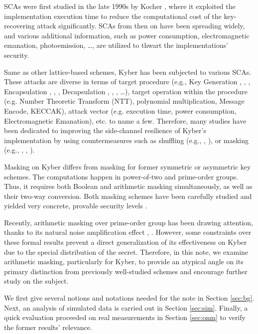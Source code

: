 \documentclass{llncs}
\begin{document}
	SCAs were first studied in the late 1990s by Kocher \cite{kocher}, where it exploited the implementation execution time to reduce the computational cost of the key-recovering attack significantly. SCAs from then on have been spreading widely, and various  additional information, such as power consumption, electromagnetic emanation, photoemission, \dots, are utilized to thwart the implementations' security.
	
	Same as other lattice-based schemes, Kyber has been subjected to various SCAs. These attacks are diverse in terms of target procedure (e.g., Key Generation \cite{primas}, \cite{primas2}, \cite{liu}, Encapsulation \cite{menc1}, \cite{menc2}, \cite{menc3}, Decapsulation \cite{decaps1}, \cite{decaps2}, \cite{decaps3}, \dots), target operation within the procedure (e.g. Number Theoretic Transform (NTT), polynomial multiplication, Message Encode, KECCAK), attack vector (e.g. execution time, power consumption, Electromagnetic Emanation), etc. to name a few. Therefore, many studies have been dedicated to improving the side-channel resilience of Kyber's implementation by using countermeasures such as shuffling (e.g.,  \cite{shuffling}, \cite{menc1}), or masking (e.g.,  \cite{scr}, \cite{Kmask1}, \cite{Kmaskimp0}).
	
	
	
	Masking on Kyber differs from masking for former symmetric or asymmetric key schemes. The computations happen in power-of-two and prime-order groups. Thus, it requires both Boolean and arithmetic masking simultaneously, as well as their two-way conversion. Both masking schemes have been carefully studied and yielded very concrete, provable security levels . 
	
	Recently, arithmetic masking over prime-order group has been drawing attention, thanks to its natural noise amplification effect \cite{optimalmask}, \cite{primemask}. However, some constraints over these formal results prevent a direct generalization of its effectiveness on Kyber due to the special distribution of the secret. Therefore, in this note, we examine arithmetic masking, particularly for Kyber, to provide an atypical angle on its primary distinction from previously well-studied schemes and encourage further study on the subject.
	
	
	We first give several notions and notations needed for the note in Section \ref{sec:bg}. Next, an analysis of simulated data is carried out in Section \ref{sec:sim}. Finally, a quick evaluation proceeded on real measurements in Section \ref{sec:onm} to verify the former results' relevance.
\end{document}
